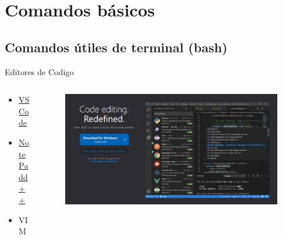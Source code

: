\documentclass{beamer}
\begin{document}
 
  

\section{Comandos básicos}

\subsection {Comandos útiles de terminal (bash)}


\begin{frame}{Editores de Codigo}
  
  \begin{columns}
    \begin{column}{0.4\textwidth}
      \begin{itemize}
        \LARGE
        \item \href{https://code.visualstudio.com/}{VS Code}
        \item \href{https://notepad-plus-plus.org/downloads/v8.5.4/}{NotePadd++} 
        \item VIM 
      \end{itemize}
    \end{column}
    \begin{column}{0.5\textwidth}
    \begin{figure}
      \includegraphics[width=1.2\textwidth]{images/vscode.png}
    \end{figure}
    \end{column}
  \end{columns}
  
  
  \end{frame}
\end{document}
